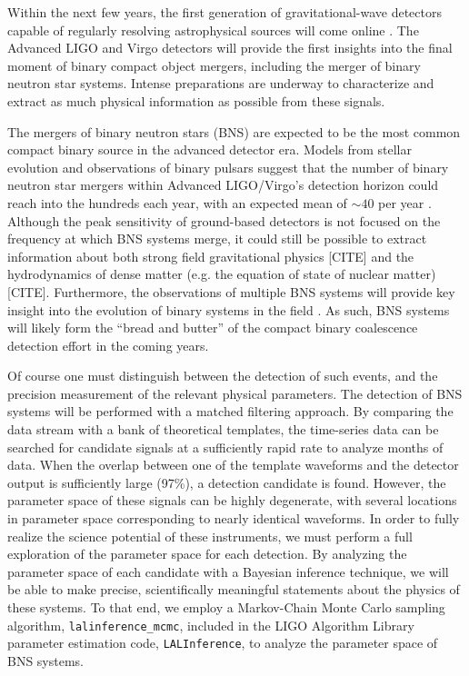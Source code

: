 \documentclass[11pt,a4paper]{emulateapj} 
\newcommand{\carl}[1]{{\color{red} #1}}
\begin{document}
Within the next few years, the first generation of gravitational-wave
detectors capable of regularly resolving astrophysical sources will
come online \citep{AdvLIGO,AdvVirgo}.  The Advanced LIGO and Virgo
detectors will provide the first insights into the final moment of
binary compact object mergers, including the merger of binary neutron
star systems.  Intense preparations are underway to characterize and
extract as much physical information as possible from these signals.
 
The mergers of binary neutron stars (BNS) are expected to be the most
common compact binary source in the advanced detector era.  Models
from stellar evolution and observations of binary pulsars suggest that
the number of binary neutron star mergers within Advanced LIGO/Virgo's
detection horizon could reach into the hundreds each year, with an
expected mean of $\sim 40$ per year \citep{RatesPaper}.  Although the
peak sensitivity of ground-based detectors is not focused on the
frequency at which BNS systems merge, it could still be possible to
extract information about both strong field gravitational physics
\carl{[CITE]} and the hydrodynamics of dense matter (e.g. the equation
of state of nuclear matter) \carl{[CITE]}.  Furthermore, the
observations of multiple BNS systems will provide key insight into the
evolution of binary systems in the field \citep{VickyRates,KimRates}
. As such, BNS systems will likely form the ``bread and butter'' of
the compact binary coalescence detection effort in the coming years.


Of course one must distinguish between the detection of such events,
and the precision measurement of the relevant physical parameters.
The detection of BNS systems will be performed with a matched
filtering approach.  By comparing the data stream with a bank of
theoretical templates, the time-series data can be searched for
candidate signals at a sufficiently rapid rate to analyze months of
data.  When the overlap between one of the template waveforms and the
detector output is sufficiently large (97\%), a detection candidate is
found.  However, the parameter space of these signals can be highly
degenerate, with several locations in parameter space corresponding to
nearly identical waveforms.  In order to fully realize the science
potential of these instruments, we must perform a full exploration of
the parameter space for each detection.  By analyzing the parameter
space of each candidate with a Bayesian inference technique, we will
be able to make precise, scientifically meaningful statements about
the physics of these systems.  To that end, we employ a Markov-Chain
Monte Carlo sampling algorithm, \texttt{lalinference\_mcmc}, included
in the LIGO Algorithm Library parameter estimation code,
\texttt{LALInference}, to analyze the parameter space of BNS systems.
\end{document}

